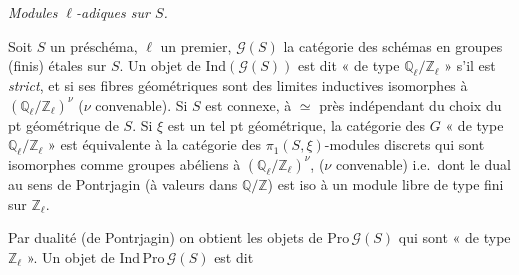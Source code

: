 \documentclass[11pt,a4paper]{article}
\begin{document}
\emph{Modules $\ell$-adiques sur $S$.}

Soit $S$ un préschéma, $\ell$ un premier, \struck{\ill{}}
 $\mathcal{G}(S)$ la catégorie des schémas en
groupes (finis) étales sur $S$. Un objet de $\mathrm{Ind}(\mathcal{G}(S))$
est dit « de type $\mathbb{Q}_{\ell}/\mathbb{Z}_{\ell}$ » s'il est
\emph{strict}, et si ses fibres géométriques sont des limites inductives
isomorphes à $(\mathbb{Q}_{\ell}/\mathbb{Z}_{\ell})^{\nu}$ ($\nu$
convenable). Si $S$ est connexe,  à $\simeq$ près  indépendant du choix du pt
géométrique de $S$. Si $\xi$ est un tel pt géométrique, la
\struck{\ill{}} catégorie des $G$ « de type
$\mathbb{Q}_{\ell}/\mathbb{Z}_{\ell}$ » est  équivalente
à la catégorie des $\pi_{1}(S, \xi)$-modules discrets qui sont isomorphes
comme groupes abéliens à $(\mathbb{Q}_{\ell}/\mathbb{Z}_{\ell})^{\nu}$,
\struck{\ill{}} ($\nu$ convenable) i.e.\ dont le dual au sens de
Pontrjagin (à valeurs dans $\mathbb{Q}/\mathbb{Z}$) est iso à un module
libre de type fini sur $\mathbb{Z}_{\ell}$.

Par dualité (de Pontrjagin) on obtient les objets de
$\mathrm{Pro}\,\mathcal{G}(S)$ qui sont « de type $\mathbb{Z}_{\ell}$ ».
Un objet de $\mathrm{Ind}\,\mathrm{Pro}\,\mathcal{G}(S)$ est dit
\end{document}

